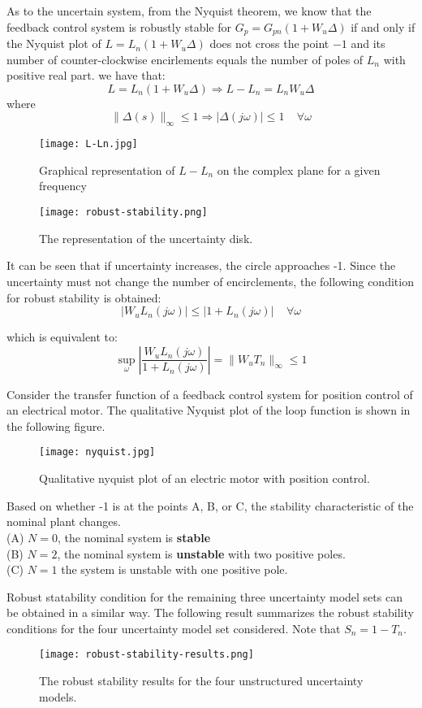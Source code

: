 As to the uncertain system, from the Nyquist theorem, we know that the feedback control system is robustly stable for $G_p = G_{pn}(1 + W_u\Delta)$ if and only if the Nyquist plot of $L = L_n(1 + W_u\Delta)$ does not cross the point $-1$ and its number of counter-clockwise encirlements equals the number of poles of $L_n$ with positive real part. we have that:
\[
L = L_n(1+W_u\Delta) \Rightarrow L-L_n = L_n W_u\Delta
\]
where
\[
\|\Delta(s)\|_\infty \leq 1 \Rightarrow |\Delta(j\omega)|\leq 1 \:\:\:\:\: \forall \omega
\]

\begin{figure}[H]
    \centering
    \texttt{[image: L-Ln.jpg]}
    \caption{Graphical representation of $L-L_n$ on the complex plane for a given frequency}
\end{figure}

\begin{figure}[H]
    \centering
    \texttt{[image: robust-stability.png]}
    \caption{The representation of the uncertainty disk.}
\end{figure}
It can be seen that if uncertainty increases, the circle approaches -1.
Since the uncertainty must not change the number of encirclements, the following condition for robust stability is obtained:
\[
|W_uL_n(j\omega)|\leq|1+L_n(j\omega)| \:\:\:\:\: \forall \omega
\]

which is equivalent to:
\[
\sup\limits_{\omega}|\frac{W_uL_n(j\omega)}{1+L_n(j\omega)}|=\|W_uT_n\|_\infty \leq 1
\]

\begin{example}
Consider the transfer function of a feedback control system for position control of an electrical motor. The qualitative Nyquist plot of the loop function is shown in the following figure.
\begin{figure}[H]
    \centering
    \texttt{[image: nyquist.jpg]}
    \caption{Qualitative nyquist plot of an electric motor with position control.}
\end{figure}
Based on whether -1 is at the points A, B, or C, the stability characteristic of the nominal plant changes.\\
(A) $N = 0$, the nominal system is \textbf{stable}\\
(B) $N = 2$, the nominal system is \textbf{unstable} with two positive poles.\\
(C) $N = 1$ the system is unstable with one positive pole.
\end{example}
Robust statability condition for the remaining three uncertainty model sets can be obtained in a similar way. The following result summarizes the robust stability conditions for the four uncertainty model set considered. Note that $S_n = 1 - T_n$.
\begin{figure}[H]
    \centering
    \texttt{[image: robust-stability-results.png]}
    \caption{The robust stability results for the four unstructured uncertainty models.}
    \end{figure}

